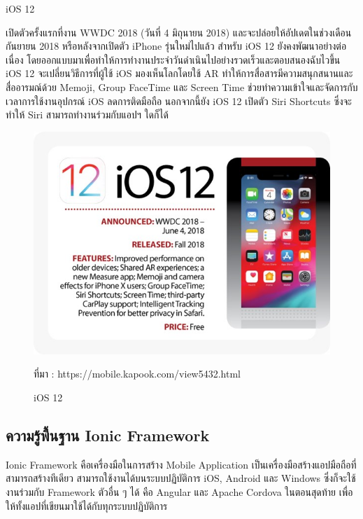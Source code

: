 	iOS 12 

	เปิดตัวครั้งแรกที่งาน WWDC 2018 (วันที่ 4 มิถุนายน 2018) และจะปล่อยให้อัปเดตในช่วงเดือนกันยายน 2018 หรือหลังจากเปิดตัว iPhone รุ่นใหม่ไปแล้ว สำหรับ iOS 12 ยังคงพัฒนาอย่างต่อเนื่อง โดยออกแบบมาเพื่อทำให้การทำงานประจำวันดำเนินไปอย่างรวดเร็วและตอบสนองฉับไวขึ้น iOS 12 จะเปลี่ยนวิธีการที่ผู้ใช้ iOS มองเห็นโลกโดยใช้ AR ทำให้การสื่อสารมีความสนุกสนานและสื่ออารมณ์ด้วย Memoji, Group FaceTime และ Screen Time ช่วยทำความเข้าใจและจัดการกับเวลาการใช้งานอุปกรณ์ iOS ลดการติดมือถือ นอกจากนี้ยัง iOS 12 เปิดตัว Siri Shortcuts ซึ่งจะทำให้ Siri สามารถทำงานร่วมกับแอปฯ ใดก็ได้

	\begin{figure}[H]
		\centering
		\includegraphics[width=0.8\columnwidth]{Figures/2/iOS/iOS12}
		\caption{iOS 12}{ที่มา : https://mobile.kapook.com/view5432.html}
		\label{Fig:iosversion12}
	\end{figure}


	 \subsection{ความรู้พื้นฐาน Ionic Framework}
	 Ionic Framework \cite{ionicref} คือเครื่องมือในการสร้าง Mobile Application เป็นเครื่องมือสร้างแอปมือถือที่สามารถสร้างทีเดียว สามารถใช้งานได้บนระบบปฏิบัติการ 
	 iOS, Android และ Windows ซึ่งก็จะใช้งานร่วมกับ Framework ตัวอื่น ๆ ได้ คือ Angular และ Apache Cordova 
	 ในตอนสุดท้าย เพื่อให้ทั้งแอปที่เขียนมาใช้ได้กับทุกระบบปฏิบัติการ

